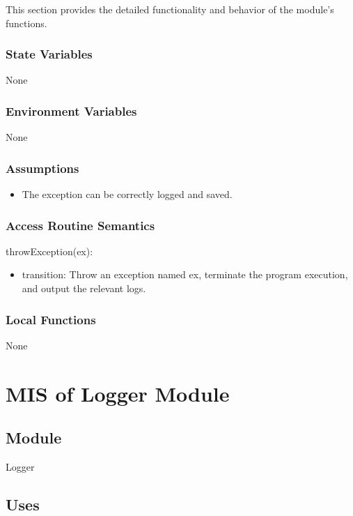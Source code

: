 \documentclass[12pt, titlepage]{article}
\begin{document}
This section provides the detailed functionality and behavior of the module’s
functions.

\subsubsection{State Variables}

None

\subsubsection{Environment Variables}

None

\subsubsection{Assumptions}

\begin{itemize}
\item The exception can be correctly logged and saved.
\end{itemize}

\subsubsection{Access Routine Semantics}

\noindent throwException(ex):
\begin{itemize}
\item transition: Throw an exception named ex, terminate the program execution,
and output the relevant logs.
\end{itemize}

\subsubsection{Local Functions}

None

\newpage

\section{MIS of Logger Module} \label{MIS_Logger}

\subsection{Module}

Logger

\subsection{Uses}
\end{document}
